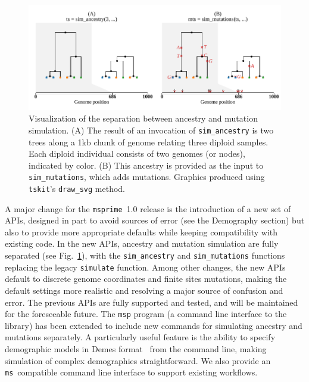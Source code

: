 \documentclass[9pt,twocolumn,twoside,lineno]{gsajnl}
\newcommand{\msprime}[0]{\texttt{msprime}}
\newcommand{\tskit}[0]{\texttt{tskit}}
\newcommand{\ms}[0]{\texttt{ms}}
\begin{document}
\begin{figure}
    \begin{center}
    \includegraphics{illustrations/mutated_tree}
    \end{center}
    \caption{
        \label{fig-mutated-trees}
        Visualization of the separation between ancestry and mutation
        simulation. (A) The result of an invocation of \texttt{sim\_ancestry}
        is two trees along a 1kb chunk of genome relating three diploid samples.
        Each diploid individual consists of two genomes (or nodes), indicated
        by color.
        (B) This ancestry is provided as the input to \texttt{sim\_mutations},
        which adds mutations.
        Graphics produced using \tskit's \texttt{draw\_svg} method.
    }
\end{figure}

A major change for the \msprime\ 1.0 release is the introduction of a new set of APIs,
designed in part to avoid sources of error (see the Demography section) but
also to provide more appropriate defaults while keeping compatibility with
existing code. In the new APIs, ancestry and mutation simulation are fully
separated (see Fig.~\ref{fig-mutated-trees}),
with the \texttt{sim\_ancestry} and \texttt{sim\_mutations}
functions replacing the legacy \texttt{simulate} function. Among other changes,
the new APIs default to discrete genome coordinates and finite sites mutations,
making the default settings more realistic and resolving a major source of confusion and error.
The previous APIs are fully
supported and tested, and will be maintained for the foreseeable future.
The \texttt{msp} program (a command line interface to the library)
has been extended to include new commands
for simulating ancestry and mutations separately. A particularly useful
feature is the ability to specify demographic models in
Demes format~\citep{gower2021demes} from the command line,
making simulation of complex demographies straightforward.
We also provide an \ms\ compatible
command line interface to support existing workflows.
\end{document}
